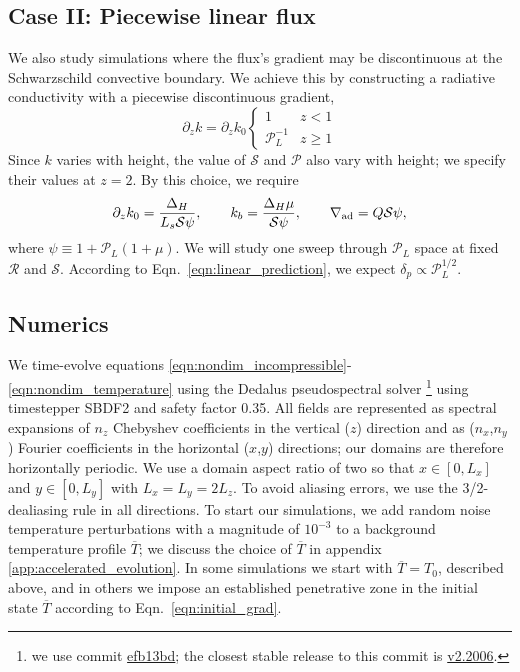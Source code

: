 \documentclass[twocolumn]{aastex631}
\newcommand{\gradad}{\ensuremath{\nabla_{\rm{ad}}}}
\newcommand{\mP}{\ensuremath{\mathcal{P}}}
\newcommand{\mR}{\ensuremath{\mathcal{R}}}
\newcommand{\mS}{\ensuremath{\mathcal{S}}}
\renewcommand{\bar}[1]{\overline{#1}}
\begin{document}
\subsection{Case II: Piecewise linear flux}
We also study simulations where the flux's gradient may be discontinuous at the Schwarzschild convective boundary.
We achieve this by constructing a radiative conductivity with a piecewise discontinuous gradient,
\begin{equation}
\partial_z k = \partial_z k_0
\begin{cases}
1	&	z < 1 \\
\mP_L^{-1} &	z \geq 1
\end{cases}
\label{eqn:sim_linear_k}
\end{equation}
Since $k$ varies with height, the value of $\mS$ and $\mP$ also vary with height; we specify their values at $z = 2$.
By this choice, we require
\begin{equation}
\partial_z k_0 = \frac{\Delta_H}{L_s \mS \psi},\qquad
k_b = \frac{\Delta_H\mu}{\mS\psi},\qquad
\gradad = Q \mS \psi,
\end{equation}
where $\psi \equiv 1 + \mP_L(1 + \mu)$.
We will study one sweep through $\mP_L$ space at fixed $\mR$ and $\mS$.
According to Eqn.~\ref{eqn:linear_prediction}, we expect $\delta_p \propto \mP_L^{1/2}$.

\subsection{Numerics}
\label{sct:numerics}
We time-evolve equations \ref{eqn:nondim_incompressible}-\ref{eqn:nondim_temperature} using the Dedalus pseudospectral solver \citep{burns_etal_2020}\footnote{we use commit \href{https://github.com/DedalusProject/dedalus/commit/efb13bdaa09816dde3eee897bc2a15fc284ea2f1}{efb13bd}; the closest stable release to this commit is \href{https://github.com/DedalusProject/dedalus/releases/tag/v2.2006}{v2.2006}.} using timestepper SBDF2 \citep{wang&ruuth2008} and safety factor 0.35.
All fields are represented as spectral expansions of $n_z$ Chebyshev coefficients in the vertical ($z$) direction and as ($n_x$,$n_y$) Fourier coefficients in the horizontal ($x$,$y$) directions; our domains are therefore horizontally periodic.
We use a domain aspect ratio of two so that $x \in [0, L_x]$ and $y \in [0, L_y]$ with $L_x = L_y = 2 L_z$.
To avoid aliasing errors, we use the 3/2-dealiasing rule in all directions.
To start our simulations, we add random noise temperature perturbations with a magnitude of $10^{-3}$ to a background temperature profile $\overline{T}$; we discuss the choice of $\overline{T}$ in appendix \ref{app:accelerated_evolution}.
In some simulations we start with $\bar{T} = T_0$, described above, and in others we impose an established penetrative zone in the initial state $\bar{T}$ according to Eqn.~\ref{eqn:initial_grad}.
\end{document}
